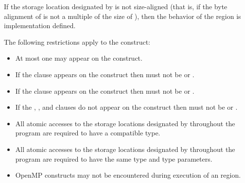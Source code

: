 If the storage location designated by  is not size-aligned (that is, if the byte alignment 
of  is not a multiple of the size of ), then the behavior of the  region is 
implementation defined.

\begin{samepage}


\restrictions

The following restrictions apply to the  construct:

\begin{itemize}
\item At most one  may appear on the construct.

\item If the  clause appears on the construct then
 must not be  or .

\item If the  clause appears on the construct then
 must not be  or .

\item If the , , and  clauses do not
appear on the construct then  must not be 
or .
\end{itemize}

\begin{ccppspecific}
\begin{itemize}
\item All atomic accesses to the storage locations designated by  throughout the program 
are required to have a compatible type. 
\end{itemize}
\end{ccppspecific}
\end{samepage}

\begin{fortranspecific}
\begin{itemize}
\item All atomic accesses to the storage locations designated by  throughout the program 
are required to have the same type and type parameters. 
\end{itemize}
\end{fortranspecific}

\begin{itemize}
\item OpenMP constructs may not be encountered during execution of an
 region.
\end{itemize}

